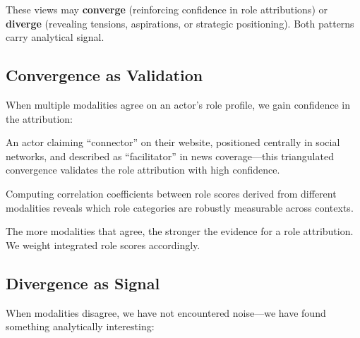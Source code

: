 \documentclass[../main.tex]{subfiles}
\begin{document}
These views may \textbf{converge} (reinforcing confidence in role attributions) or \textbf{diverge} (revealing tensions, aspirations, or strategic positioning). Both patterns carry analytical signal.

\subsection{Convergence as Validation}

When multiple modalities agree on an actor's role profile, we gain confidence in the attribution:

\begin{description}[leftmargin=0.5cm, itemsep=0.3em]
\item[Role Confirmation] An actor claiming ``connector'' on their website, positioned centrally in social networks, and described as ``facilitator'' in news coverage---this triangulated convergence validates the role attribution with high confidence.

\item[Cross-Modal Correlation] Computing correlation coefficients between role scores derived from different modalities reveals which role categories are robustly measurable across contexts.

\item[Triangulation Strength] The more modalities that agree, the stronger the evidence for a role attribution. We weight integrated role scores accordingly.
\end{description}

\subsection{Divergence as Signal}

When modalities disagree, we have not encountered noise---we have found something analytically interesting:
\end{document}
